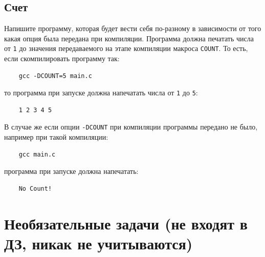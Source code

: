 \documentclass{article}
\begin{document}
\subsection{Счет}
Напишите программу, которая будет вести себя по-разному в зависимости от того какая опция была передана при компиляции. Программа должна печатать числа от \texttt{1} до значения передаваемого на этапе компиляции макроса \texttt{COUNT}.
То есть, если скомпилировать программу так:
\begin{verbatim}
    gcc -DCOUNT=5 main.c
\end{verbatim}
то программа при запуске должна напечатать числа от \texttt{1} до \texttt{5}:
\begin{verbatim}
    1 2 3 4 5
\end{verbatim}
В случае же если опции \texttt{-DCOUNT} при компиляции программы передано не было, например при такой компиляции:
\begin{verbatim}
    gcc main.c
\end{verbatim}
программа при запуске должна напечатать:
\begin{verbatim}
    No Count!
\end{verbatim}

\newpage


\section*{Необязательные задачи (не входят в ДЗ, никак не учитываются)}
\setcounter{subsection}{0}
\end{document}
